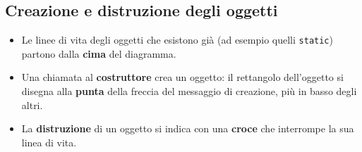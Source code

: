 \subsection{Creazione e distruzione degli oggetti}

\begin{itemize}
  \item Le linee di vita degli oggetti che esistono già (ad esempio quelli \texttt{static}) partono dalla \textbf{cima} del diagramma.
  \item Una chiamata al \textbf{costruttore} crea un oggetto: il rettangolo dell'oggetto si disegna alla \textbf{punta} della freccia
        del messaggio di creazione, più in basso degli altri.
  \item La \textbf{distruzione} di un oggetto si indica con una \textbf{croce} che interrompe la sua linea di vita.
\end{itemize}

